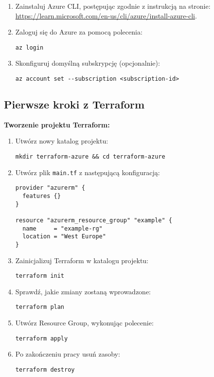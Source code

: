 \documentclass{article}
\begin{document}
\begin{enumerate}
    \item Zainstaluj Azure CLI, postępując zgodnie z instrukcją na stronie: \url{https://learn.microsoft.com/en-us/cli/azure/install-azure-cli}.
    \item Zaloguj się do Azure za pomocą polecenia:
    \begin{lstlisting}
az login
    \end{lstlisting}
    \item Skonfiguruj domyślną subskrypcję (opcjonalnie):
    \begin{lstlisting}
az account set --subscription <subscription-id>
    \end{lstlisting}
\end{enumerate}

\subsection{Pierwsze kroki z Terraform}
\textbf{Tworzenie projektu Terraform:}
\begin{enumerate}
    \item Utwórz nowy katalog projektu:
    \begin{lstlisting}
mkdir terraform-azure && cd terraform-azure
    \end{lstlisting}
    \item Utwórz plik \texttt{main.tf} z następującą konfiguracją:
    \begin{lstlisting}
provider "azurerm" {
  features {}
}

resource "azurerm_resource_group" "example" {
  name     = "example-rg"
  location = "West Europe"
}
    \end{lstlisting}
    \item Zainicjalizuj Terraform w katalogu projektu:
    \begin{lstlisting}
terraform init
    \end{lstlisting}
    \item Sprawdź, jakie zmiany zostaną wprowadzone:
    \begin{lstlisting}
terraform plan
    \end{lstlisting}
    \item Utwórz Resource Group, wykonując polecenie:
    \begin{lstlisting}
terraform apply
    \end{lstlisting}
    \item Po zakończeniu pracy usuń zasoby:
    \begin{lstlisting}
terraform destroy
    \end{lstlisting}
\end{enumerate}
\end{document}
